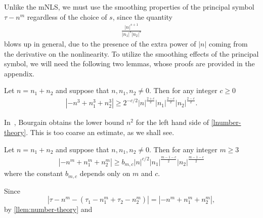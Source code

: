 %
%
Unlike the mNLS, we must use the smoothing properties of the
principal symbol $\tau - n^m$ regardless of the choice of $s$, since the quantity
%
%
\begin{equation}
	\label{lconvo-multiplier}
	\begin{split}
		\frac{|n|^{s+1}}{|n_1|^s |n_2|^s }
	\end{split}
\end{equation}
%
%
blows up in general, due to the presence of the extra power of $|n|$ coming from the derivative on
the nonlinearity. To utilize the smoothing effects of the principal symbol, we
will need the following two lemmas, whose
proofs are provided in the appendix.
%
%
%
\begin{lemma}
	\label{llem:number-theory1}
	Let $n=n_1 + n_2$ and suppose that $n, n_1, n_2\neq
	0$. Then for any integer $c \ge 0$
%
%
\begin{equation}
	\begin{split}
		\label{lnumber-theory1}
		| - n^{3} + n_1^3 + n_2^3| \ge 2^{-c/2} | n |^{\frac{2+c}{2}} | n_{1}
		|^{\frac{2-c}{2}}| n_2 |^{\frac{2-c}{2}}.
	\end{split}
\end{equation}
%
%
\end{lemma}
%
%
\begin{remark}
	In~\cite{Bourgain-Fourier-transfo}, Bourgain obtains the lower bound $n^2$ for
	the left hand side of \eqref{lnumber-theory}. This is too coarse an estimate,
	as we shall see.
\end{remark}
%
%
%
%
\begin{lemma}
	\label{llem:number-theory}
	Let $n=n_1 + n_2$ and suppose that $n, n_1, n_2\neq
	0$. Then for any integer  $m \ge 3$
%
%
\begin{equation}
	\begin{split}
		\label{lnumber-theory}
		| - n^{m} + n_1^{m} + n_2^{m }| \ge b_{m, c } 
		|n|^{c/2} |n_1|^{\frac{m-1-c}{2}} | n_2 |^{\frac{m-1-c}{2}}
		\end{split}
\end{equation}
%
%
where the constant $b_{m,c}$ depends only on $m$ and $c$. 
\end{lemma}
%
%
%
%
%
%
Since $$| \tau - n^{m} - \left( \tau_1 - n_1^{m} 
+ \tau_2 - n_2^{m }  \right ) | = | - n^{m} + n_1^{m} +
n_2^{m }|,$$ by \cref{llem:number-theory} and
